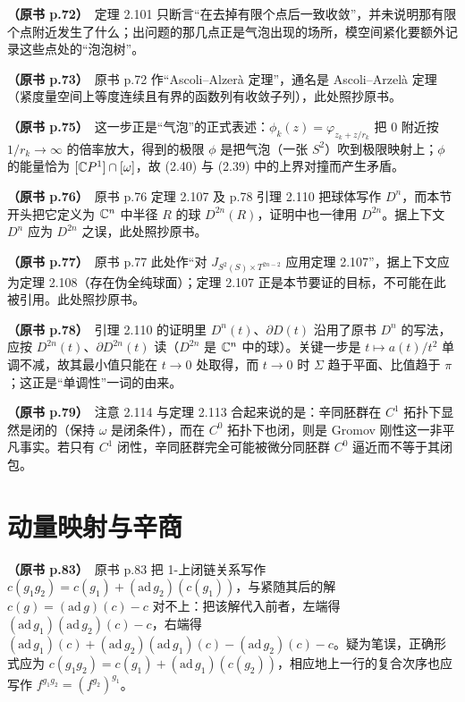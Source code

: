 \noindent \textbf{（原书 p.72）}\ 定理 2.101 只断言“在去掉有限个点后一致收敛”，并未说明那有限个点附近发生了什么；出问题的那几点正是气泡出现的场所，模空间紧化要额外记录这些点处的“泡泡树”。\par\smallskip

\noindent \textbf{（原书 p.73）}\ 原书 p.72 作“Ascoli–Alzerà 定理”，通名是 Ascoli–Arzelà 定理（紧度量空间上等度连续且有界的函数列有收敛子列），此处照抄原书。\par\smallskip

\noindent \textbf{（原书 p.75）}\ 这一步正是“气泡”的正式表述：$\phi_k(z)=\varphi_{z_k+z/r_k}$ 把 $0$ 附近按 $1/r_k\to\infty$ 的倍率放大，得到的极限 $\phi$ 是把气泡（一张 $S^2$）吹到极限映射上；$\phi$ 的能量恰为 $[\mathbb{C} P^1]\cap[\omega]$，故 (2.40) 与 (2.39) 中的上界对撞而产生矛盾。\par\smallskip

\noindent \textbf{（原书 p.76）}\ 原书 p.76 定理 2.107 及 p.78 引理 2.110 把球体写作 $D^n$，而本节开头把它定义为 $\mathbb{C}^n$ 中半径 $R$ 的球 $D^{2n}(R)$，证明中也一律用 $D^{2n}$。据上下文 $D^n$ 应为 $D^{2n}$ 之误，此处照抄原书。\par\smallskip

\noindent \textbf{（原书 p.77）}\ 原书 p.77 此处作“对 $J_{S^2(S)\times T^{2n-2}}$ 应用定理 2.107”，据上下文应为定理 2.108（存在伪全纯球面）；定理 2.107 正是本节要证的目标，不可能在此被引用。此处照抄原书。\par\smallskip

\noindent \textbf{（原书 p.78）}\ 引理 2.110 的证明里 $D^n(t)$、$\partial D(t)$ 沿用了原书 $D^n$ 的写法，应按 $D^{2n}(t)$、$\partial D^{2n}(t)$ 读（$D^{2n}$ 是 $\mathbb{C}^n$ 中的球）。关键一步是 $t\mapsto a(t)/t^2$ 单调不减，故其最小值只能在 $t\to0$ 处取得，而 $t\to0$ 时 $\Sigma$ 趋于平面、比值趋于 $\pi$；这正是“单调性”一词的由来。\par\smallskip

\noindent \textbf{（原书 p.79）}\ 注意 2.114 与定理 2.113 合起来说的是：辛同胚群在 $C^1$ 拓扑下显然是闭的（保持 $\omega$ 是闭条件），而在 $C^0$ 拓扑下也闭，则是 Gromov 刚性这一非平凡事实。若只有 $C^1$ 闭性，辛同胚群完全可能被微分同胚群 $C^0$ 逼近而不等于其闭包。\par\smallskip

\section*{动量映射与辛商}

\noindent \textbf{（原书 p.83）}\ 原书 p.83 把 1-上闭链关系写作 $c(g_1g_2)=c(g_1)+(\mathrm{ad}\,g_2)(c(g_1))$，与紧随其后的解 $c(g)=(\mathrm{ad}\,g)(c)-c$ 对不上：把该解代入前者，左端得 $(\mathrm{ad}\,g_1)(\mathrm{ad}\,g_2)(c)-c$，右端得 $(\mathrm{ad}\,g_1)(c)+(\mathrm{ad}\,g_2)(\mathrm{ad}\,g_1)(c)-(\mathrm{ad}\,g_2)(c)-c$。疑为笔误，正确形式应为 $c(g_1g_2)=c(g_1)+(\mathrm{ad}\,g_1)(c(g_2))$，相应地上一行的复合次序也应写作 $f^{g_1g_2}=(f^{g_2})^{g_1}$。\par\smallskip

